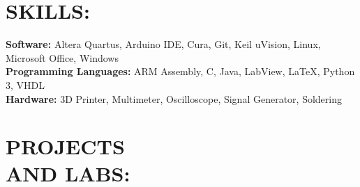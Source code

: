 \documentclass[line,margin]{res}
\begin{document}
\begin{resume}
\section{SKILLS:}

	\textbf{Software:} Altera Quartus, Arduino IDE, Cura, Git, Keil uVision, Linux, Microsoft Office, Windows \\
	\textbf{Programming Languages:} ARM Assembly, C, Java, LabView, \LaTeX, Python 3, VHDL \\
	\textbf{Hardware:} 3D Printer, Multimeter, Oscilloscope, Signal Generator, Soldering


\section{PROJECTS \\AND LABS:}



\end{resume}
\end{document}
